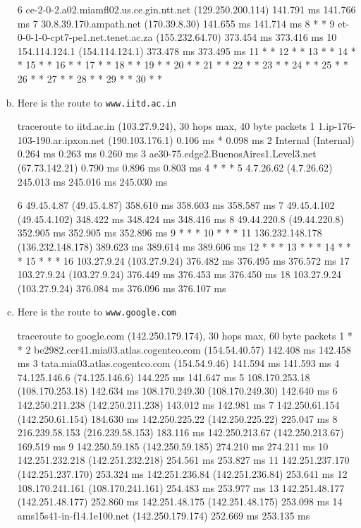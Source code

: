 \documentclass{article}
\begin{document}
\begin{enumerate}[a.]
\begin{code}
 6  ce-2-0-2.a02.miamfl02.us.ce.gin.ntt.net (129.250.200.114)  141.791 ms  141.766 ms
 7  30.8.39.170.ampath.net (170.39.8.30)  141.655 ms  141.714 ms
 8  * *
 9  et-0-0-1-0-cpt7-pe1.net.tenet.ac.za (155.232.64.70)  373.454 ms  373.416 ms
10  154.114.124.1 (154.114.124.1)  373.478 ms  373.495 ms
11  * *
12  * *
13  * *
14  * *
15  * *
16  * *
17  * *
18  * *
19  * *
20  * *
21  * *
22  * *
23  * *
24  * *
25  * *
26  * *
27  * *
28  * *
29  * *
30  * *
\end{code}
\item Here is the route to {\tt www.iitd.ac.in}
\begin{code} 
traceroute to iitd.ac.in (103.27.9.24), 30 hops max, 40 byte packets
 1  1.ip-176-103-190.ar.ipxon.net (190.103.176.1)  0.106 ms *  0.098 ms
 2  Internal (Internal)  0.264 ms  0.263 ms  0.260 ms
 3  ae30-75.edge2.BuenosAires1.Level3.net (67.73.142.21)  0.790 ms  0.896 ms  0.803 ms
 4  * * *
 5  4.7.26.62 (4.7.26.62)  245.013 ms  245.016 ms  245.030 ms
 \end{code}
 \begin{code}
 6  49.45.4.87 (49.45.4.87)  358.610 ms  358.603 ms  358.587 ms
 7  49.45.4.102 (49.45.4.102)  348.422 ms  348.424 ms  348.416 ms
 8  49.44.220.8 (49.44.220.8)  352.905 ms  352.905 ms  352.896 ms
 9  * * *
10  * * *
11  136.232.148.178 (136.232.148.178)  389.623 ms  389.614 ms  389.606 ms
12  * * *
13  * * *
14  * * *
15  * * *
16  103.27.9.24 (103.27.9.24)  376.482 ms  376.495 ms  376.572 ms
17  103.27.9.24 (103.27.9.24)  376.449 ms  376.453 ms  376.450 ms
18  103.27.9.24 (103.27.9.24)  376.084 ms  376.096 ms  376.107 ms
\end{code}
\item Here is the route to {\tt www.google.com}
\begin{code}
 traceroute to google.com (142.250.179.174), 30 hops max, 60 byte packets
 1  * *
 2  be2982.ccr41.mia03.atlas.cogentco.com (154.54.40.57)  142.408 ms  142.458 ms
 3  tata.mia03.atlas.cogentco.com (154.54.9.46)  141.594 ms  141.593 ms
 4  74.125.146.6 (74.125.146.6)  144.225 ms  141.647 ms
 5  108.170.253.18 (108.170.253.18)  142.634 ms 108.170.249.30 (108.170.249.30)  142.640 ms
 6  142.250.211.238 (142.250.211.238)  143.012 ms  142.981 ms
 7  142.250.61.154 (142.250.61.154)  184.630 ms 142.250.225.22 (142.250.225.22)  225.047 ms
 8  216.239.58.153 (216.239.58.153)  183.116 ms 142.250.213.67 (142.250.213.67)  169.519 ms
 9  142.250.59.185 (142.250.59.185)  274.210 ms  274.211 ms
10  142.251.232.218 (142.251.232.218)  254.561 ms  253.827 ms
11  142.251.237.170 (142.251.237.170)  253.324 ms 142.251.236.84 (142.251.236.84)  253.641 ms
12  108.170.241.161 (108.170.241.161)  254.483 ms  253.977 ms
13  142.251.48.177 (142.251.48.177)  252.860 ms 142.251.48.175 (142.251.48.175)  253.098 ms
14  ams15s41-in-f14.1e100.net (142.250.179.174)  252.669 ms  253.135 ms
\end{code}


\end{enumerate}
\end{document}
